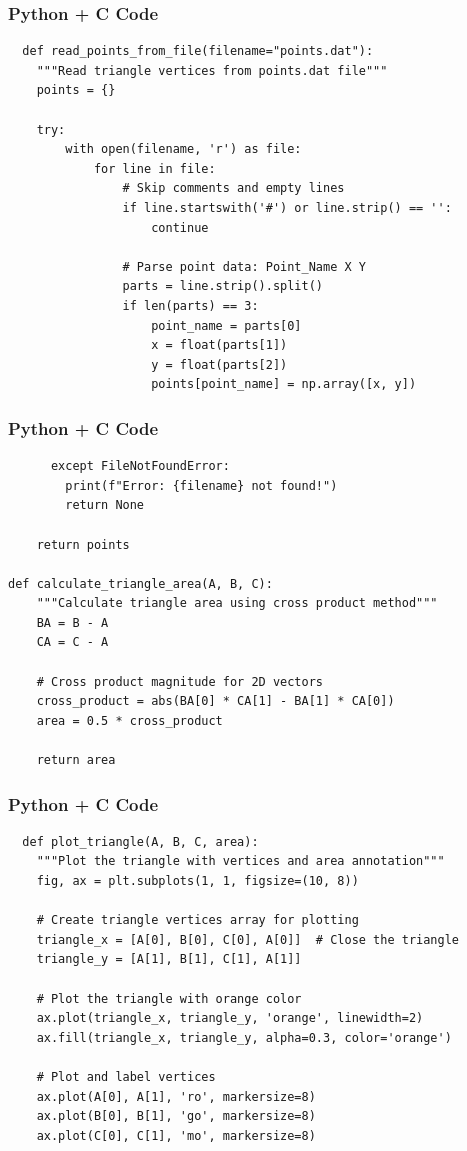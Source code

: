 \documentclass{beamer}
\begin{document}
\begin{frame}[fragile]
    \frametitle{Python + C Code}
    \begin{lstlisting}
  def read_points_from_file(filename="points.dat"):
    """Read triangle vertices from points.dat file"""
    points = {}
    
    try:
        with open(filename, 'r') as file:
            for line in file:
                # Skip comments and empty lines
                if line.startswith('#') or line.strip() == '':
                    continue
                
                # Parse point data: Point_Name X Y
                parts = line.strip().split()
                if len(parts) == 3:
                    point_name = parts[0]
                    x = float(parts[1])
                    y = float(parts[2])
                    points[point_name] = np.array([x, y])
    \end{lstlisting}
\end{frame}

\begin{frame}[fragile]
    \frametitle{Python + C Code}
    \begin{lstlisting}
      except FileNotFoundError:
        print(f"Error: {filename} not found!")
        return None
    
    return points

def calculate_triangle_area(A, B, C):
    """Calculate triangle area using cross product method"""
    BA = B - A
    CA = C - A
    
    # Cross product magnitude for 2D vectors
    cross_product = abs(BA[0] * CA[1] - BA[1] * CA[0])
    area = 0.5 * cross_product
    
    return area
    \end{lstlisting}
\end{frame}

\begin{frame}[fragile]
    \frametitle{Python + C Code}
    \begin{lstlisting}
  def plot_triangle(A, B, C, area):
    """Plot the triangle with vertices and area annotation"""
    fig, ax = plt.subplots(1, 1, figsize=(10, 8))
    
    # Create triangle vertices array for plotting
    triangle_x = [A[0], B[0], C[0], A[0]]  # Close the triangle
    triangle_y = [A[1], B[1], C[1], A[1]]
    
    # Plot the triangle with orange color
    ax.plot(triangle_x, triangle_y, 'orange', linewidth=2)
    ax.fill(triangle_x, triangle_y, alpha=0.3, color='orange')
    
    # Plot and label vertices
    ax.plot(A[0], A[1], 'ro', markersize=8)
    ax.plot(B[0], B[1], 'go', markersize=8)
    ax.plot(C[0], C[1], 'mo', markersize=8)
    \end{lstlisting}
\end{frame}
\end{document}

